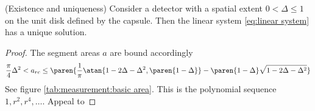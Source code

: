 \begin{myTheorem}(Existence and uniqueness)
Consider a detector with a spatial extent $0 < \Delta \le 1$ on the unit disk defined by the capsule. Then the linear system \eqref{eq:linear system} has a unique solution.
\label{thm:psi solution}
\end{myTheorem}
\begin{proof}
The segment areas $a$ are bound accordingly
\begin{equation}
  \frac{\pi}{4}\Delta^{2} < a_{rc} \le \paren{\frac{1}{\pi} \atan{1-2\Delta-\Delta^{2}, \paren{1-\Delta}} - \paren{1-\Delta} \sqrt{1-2\Delta-\Delta^{2}} }
\end{equation}
See figure \eqref{tab:measurement:basic area}.
This is the polynomial sequence $1,r^{2},r^{4},\dots$.
Appeal to \ms
\end{proof}

\endinput %